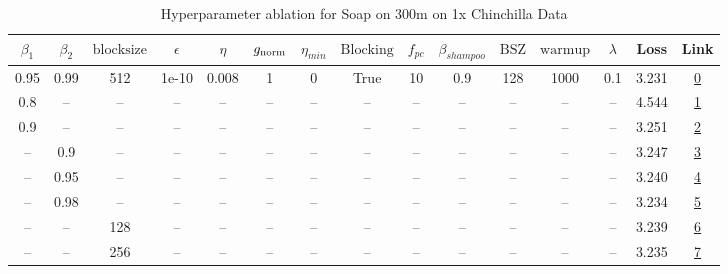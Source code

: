 \begin{table}[H]
\centering
\caption{Hyperparameter ablation for Soap on 300m on 1x Chinchilla Data}
\label{tab:ablation_soap_300m_on_1x_chinchilla_data}
\begin{tabular}{ccccccccccccccc}
\toprule
$\beta_1$ & $\beta_2$ & $\mathrm{block size}$ & $\epsilon$ & $\eta$ & $g_{\mathrm{norm}}$ & $\eta_{min}$ & $\mathrm{Blocking}$ & $f_{pc}$ & $\beta_{shampoo}$ & $\mathrm{BSZ}$ & $\mathrm{warmup}$ & $\lambda$ & Loss & Link \\
\midrule
0.95 & 0.99 & 512 & 1e-10 & 0.008 & 1 & 0 & True & 10 & 0.9 & 128 & 1000 & 0.1 & 3.231 & \href{https://wandb.ai/marin-community/optimizer-scaling/runs/sweep-300m-6B-soape63ad3blr0.008-wd0.1-minlr0-warmup1000-b10.95--02f063}{0} \\
\midrule
0.8 & -- & -- & -- & -- & -- & -- & -- & -- & -- & -- & -- & -- & 4.544 & \href{https://wandb.ai/marin-community/optimizer-scaling/runs/sweep-300m-6B-soapec0ea31lr0.008-wd0.1-minlr0-warmup1000-b10.8-b-319d07}{1} \\
0.9 & -- & -- & -- & -- & -- & -- & -- & -- & -- & -- & -- & -- & 3.251 & \href{https://wandb.ai/marin-community/optimizer-scaling/runs/sweep-300m-6B-soapee624e9lr0.008-wd0.1-minlr0-warmup1000-b10.9-b-ecd8c9}{2} \\
-- & 0.9 & -- & -- & -- & -- & -- & -- & -- & -- & -- & -- & -- & 3.247 & \href{https://wandb.ai/marin-community/optimizer-scaling/runs/sweep-300m-6B-soapeb0ca30lr0.008-wd0.1-minlr0-warmup1000-b10.95--6cae1d}{3} \\
-- & 0.95 & -- & -- & -- & -- & -- & -- & -- & -- & -- & -- & -- & 3.240 & \href{https://wandb.ai/marin-community/optimizer-scaling/runs/sweep-300m-6B-soape92b928lr0.008-wd0.1-minlr0-warmup1000-b10.95--140435}{4} \\
-- & 0.98 & -- & -- & -- & -- & -- & -- & -- & -- & -- & -- & -- & 3.234 & \href{https://wandb.ai/marin-community/optimizer-scaling/runs/sweep-300m-6B-soape74fad0lr0.008-wd0.1-minlr0-warmup1000-b10.95--438330}{5} \\
-- & -- & 128 & -- & -- & -- & -- & -- & -- & -- & -- & -- & -- & 3.239 & \href{https://wandb.ai/marin-community/optimizer-scaling/runs/sweep-300m-6B-soapef30d89lr0.008-wd0.1-minlr0-warmup1000-b10.95--88ca79}{6} \\
-- & -- & 256 & -- & -- & -- & -- & -- & -- & -- & -- & -- & -- & 3.235 & \href{https://wandb.ai/marin-community/optimizer-scaling/runs/sweep-300m-6B-soape1270celr0.008-wd0.1-minlr0-warmup1000-b10.95--5fd15c}{7} \\

\end{tabular}
\end{table}
